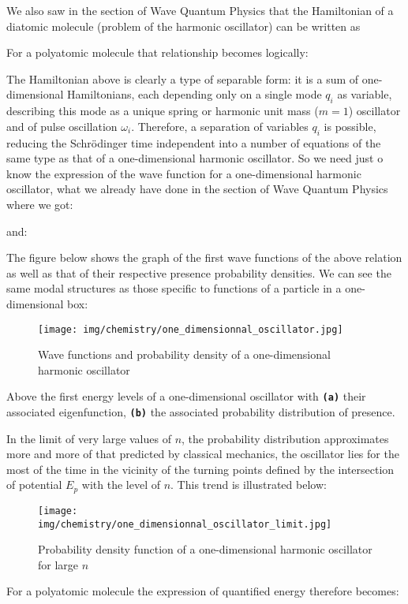 	We also saw in the section of Wave Quantum Physics that the Hamiltonian of a diatomic molecule (problem of the harmonic oscillator) can be written as
	
	For a polyatomic molecule that relationship becomes logically:
	
	The Hamiltonian above is clearly a type of separable form: it is a sum of one-dimensional Hamiltonians, each depending only on a single mode $q_i$ as variable, describing this mode as a unique spring or harmonic unit mass ($m=1$) oscillator and of pulse oscillation $\omega_i$. Therefore, a separation of variables $q_i$ is possible, reducing the Schrödinger time independent into a number of equations of the same type as that of a one-dimensional harmonic oscillator. So we need just o know the expression of the wave function for a one-dimensional harmonic oscillator, what we already have done in the section of Wave Quantum Physics where we got:
	
	and:
	
	The figure below shows the graph of the first wave functions of the above relation as well as that of their respective presence probability densities. We can see the same modal structures as those specific to functions of a particle in a one-dimensional box:
	\begin{figure}[H]
		\begin{center}
		\texttt{[image: img/chemistry/one\_dimensionnal\_oscillator.jpg]}
		\end{center}	
		\caption{Wave functions and probability density of a one-dimensional harmonic oscillator}
	\end{figure}
	Above the first energy levels of a one-dimensional oscillator with \texttt{\textbf{(a)}} their associated eigenfunction, \texttt{\textbf{(b)}} the  associated probability distribution of presence.
	
	In the limit of very large values of $n$, the probability distribution approximates more and more of that predicted by classical mechanics, the oscillator lies for the most of the time in the vicinity of the turning points defined by the intersection of potential $E_{p}$ with the level of $n$. This trend is illustrated below:
	\begin{figure}[H]
		\begin{center}
		\texttt{[image: img/chemistry/one\_dimensionnal\_oscillator\_limit.jpg]}
		\end{center}	
		\caption{Probability density function of a one-dimensional harmonic oscillator for large $n$}
	\end{figure}
	For a polyatomic molecule the expression of quantified energy therefore becomes:
	
